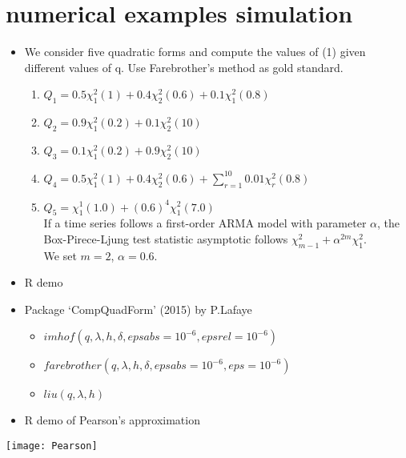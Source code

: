 \documentclass[10pt]{beamer}
\begin{document}
\section{numerical examples simulation}

\begin{frame}
	\begin{itemize}
		\item We consider five quadratic forms and compute the values of (1) given different values of q. Use Farebrother's method as gold standard.
		\begin{enumerate}
			\item $Q_1=	0.5\chi_1^2(1)+0.4\chi_2^2(0.6)+0.1\chi_1^2(0.8)$	
			\item $Q_2= 0.9\chi_1^2(0.2)+0.1\chi_2^2(10)	$	
			\item $Q_3= 0.1\chi_1^2(0.2)+0.9\chi_2^2(10)	$	
			\item $Q_4= 0.5\chi_1^2(1)+0.4\chi_2^2(0.6)+\sum_{r=1}^{10}0.01\chi_r^2(0.8)$		
			\item $Q_5=\chi_1^1(1.0)+(0.6)^4\chi_1^2(7.0)$\\
			\footnotesize
			If a time series follows a first-order ARMA model with parameter $\alpha$, the Box-Pirece-Ljung test statistic asymptotic follows $\chi_{m-1}^2+\alpha^{2m}\chi_1^2$.\\
			We set $m=2$, $\alpha=0.6$.
		\end{enumerate}
		\end{itemize}
\end{frame}

\begin{frame}
	\begin{itemize}
	\item R demo
	\item Package ‘CompQuadForm’ (2015) by P.Lafaye
	\begin{itemize}
	\item $imhof(q, \lambda, h, \delta ,epsabs = 10^{-6}, epsrel = 10^{-6})$
	\item $farebrother(q, \lambda, h, \delta ,epsabs = 10^{-6}, eps = 10^{-6})$
	\item $liu(q, \lambda, h)$
    \end{itemize}
    \end{itemize}
\end{frame}

\begin{frame}
	\begin{itemize}
		\item R demo of Pearson's approximation
	\end{itemize}
	\graphicspath{{C:/Users/riyi/Desktop/yusha/fall2015-sha/STAT-5123/project}}
	\texttt{[image: Pearson]}
\end{frame}
\end{document}
